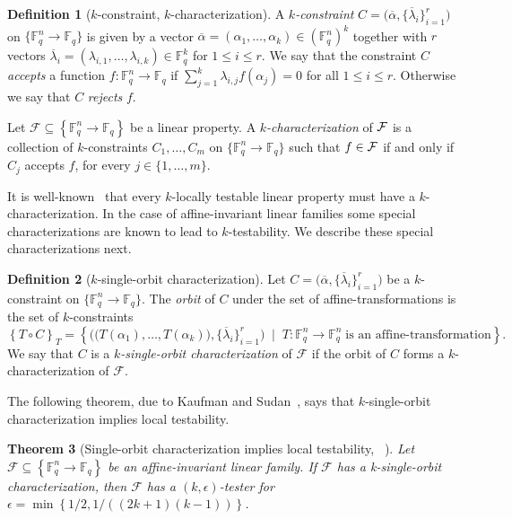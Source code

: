 \documentclass[10pt]{article}
\newtheorem{theorem}{Theorem}[section]
\theoremstyle{definition}
\newtheorem{definition}[theorem]{Definition}
\numberwithin{equation}{section}
\newcommand{\calf}{{\cal F}}
\newcommand{\F}{{\mathbb{F}}}
\newcommand{\cF}{{\mathcal{F}}}
\newcommand{\set}[1]{\left\{{#1}\right\}}
\newcommand{\bset}[1]{\bigl\{{#1}\bigr\}}
\begin{document}
\begin{definition}[$k$-constraint, $k$-characterization]
A \emph{$k$-constraint} $C=\bigl(\overline \alpha, \bset{\overline \lambda_i}_{i=1}^{r}\bigr)$
on $\{\F_{q}^n \to \F_q\}$ is
given by a vector $\overline \alpha = (\alpha_1,\ldots,\alpha_k) \in (\F_{q}^n)^k$
together with $r$ vectors
 $\overline \lambda_i = (\lambda_{i,1}, \ldots, \lambda_{i,k}) \in \F_q^k$ for
$1 \leq i \leq r$.
We say that the constraint $C$ \emph{accepts} a function $f: \F_{q}^n \to \F_{q}$ if
$\sum_{j=1}^k \lambda_{i,j} f(\alpha_j) = 0$ for all $1 \leq i \leq r$. Otherwise we say that $C$ \emph{rejects} $f$.

Let $\mathcal{F} \subseteq \set{\F_{q}^n \to \F_q}$ be a linear property.
A \emph{$k$-characterization} of $\calf$ is a collection of $k$-constraints
$C_1, \ldots, C_m$ on $\{\F_q^n \to \F_q\}$ such that $f \in \calf$ if and only if $C_j$
accepts $f$, for every $j \in \{1,\ldots,m\}$.
\end{definition}

It is well-known~\cite{BHR05} that every $k$-locally testable linear property must have a
$k$-characterization. In the case of affine-invariant linear families some special characterizations
are known to lead to $k$-testability. We describe these special characterizations next.

\begin{definition}[$k$-single-orbit characterization]\label{defn:single orbit}
Let $C=\big(\overline \alpha, \bset{\overline \lambda_i}_{i=1}^{r}\big)$ be a $k$-constraint
on $\{\F_{q}^n \to \F_q\}$.
The \emph{orbit} of $C$ under the set of affine-transformations is the set of $k$-constraints
\[\set{T \circ C}_T = \set{ \big( \big(T(\alpha_1),\ldots,T(\alpha_k)\big), \bset{\overline \lambda_i}_{i=1}^{r} \big)\; \; \bigg| \; \; T:\F_{q}^n \to \F_q^n \; \text{is an affine-transformation}}.\]
We say that $C$ is a \emph{$k$-single-orbit characterization} of $\cF$
if the orbit of $C$ forms a $k$-characterization of $\mathcal{F}$.
\end{definition}

The following theorem, due to Kaufman and Sudan~\cite{KS08}, says that $k$-single-orbit characterization implies local testability.

\begin{theorem}[Single-orbit characterization implies local testability, {\protect~\cite[Theorem 2.9]{KS08-ECCC}}]\label{thm:KS}
Let $\mathcal{F} \subseteq \set{\F_{q}^n \to \F_q}$ be an affine-invariant linear family. If
$\cF$ has a k-single-orbit characterization, then $\cF$ has a
$(k,\epsilon)$-tester for 
$\epsilon = \min\set{1/2, {1}/{((2k+1)(k-1))}}$.

\end{theorem}
\end{document}
